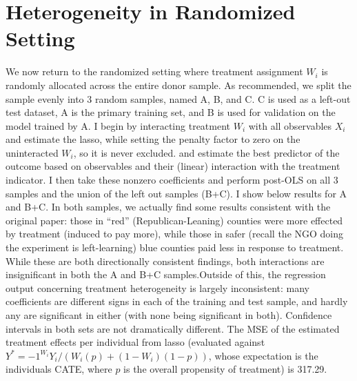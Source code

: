 \documentclass{article}
\begin{document}
\section{Heterogeneity in Randomized Setting}
We now return to the randomized setting where treatment assignment $W_i$ is randomly allocated across the entire donor sample. As recommended, we split the sample evenly into 3 random samples, named A, B, and C. C is used as a left-out test dataset, A is the primary training set, and B is used for validation on the model trained by A. I begin by interacting treatment $W_i$ with all observables $X_i$ and estimate the lasso, while setting the penalty factor to zero on the uninteracted $W_i$, so it is never excluded. and estimate the best predictor of the outcome based on observables and their (linear) interaction with the treatment indicator. I then take these nonzero coefficients and perform post-OLS on all 3 samples and the union of the left out samples (B+C). I show below results for A and B+C. In both samples, we actually find some results consistent with the original paper: those in ``red'' (Republican-Leaning) counties were more effected by treatment (induced to pay more), while those in safer (recall the NGO doing the experiment is left-learning) blue counties paid less in response to treatment. While these are both directionally consistent findings, both interactions are insignificant in both the A and B+C samples.Outside of this, the regression output concerning treatment heterogeneity is largely inconsistent: many coefficients are different signs in each of the training and test sample, and hardly any are significant in either (with none being significant in both). Confidence intervals in both sets are not dramatically different. The MSE of the estimated treatment effects per individual from lasso (evaluated against $Y^* = -1^{W_i} Y_i / (W_i(p) + (1-W_i)(1-p))$, whose expectation is the individuals CATE, where $p$ is the overall propensity of treatment) is 317.29.
\end{document}
